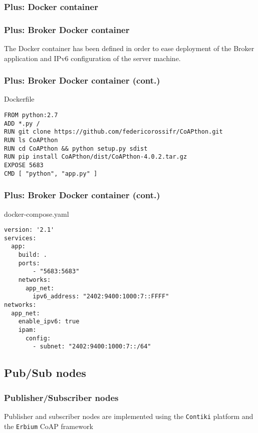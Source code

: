 \documentclass{beamer}
\begin{document}
\subsubsection{Plus: Docker container}
\begin{frame}
\frametitle{Plus: Broker Docker container}
The Docker container has been defined in order to ease deployment of the Broker application and IPv6 configuration of the server machine.
\end{frame}

\begin{frame}[fragile]
\frametitle{Plus: Broker Docker container (cont.)}
\begin{exampleblock}{Dockerfile}
	\begin{Verbatim}[fontsize=\footnotesize]
FROM python:2.7
ADD *.py /
RUN git clone https://github.com/federicorossifr/CoAPthon.git
RUN ls CoAPthon
RUN cd CoAPthon && python setup.py sdist
RUN pip install CoAPthon/dist/CoAPthon-4.0.2.tar.gz
EXPOSE 5683
CMD [ "python", "app.py" ]
	\end{Verbatim}
\end{exampleblock}
\end{frame}

\begin{frame}[fragile]
\frametitle{Plus: Broker Docker container (cont.)}
\begin{exampleblock}{docker-compose.yaml}
	\begin{Verbatim}[fontsize=\footnotesize]
version: '2.1'
services:
  app:
    build: .
    ports:
        - "5683:5683"
    networks:
      app_net:
        ipv6_address: "2402:9400:1000:7::FFFF"
networks:
  app_net:
    enable_ipv6: true
    ipam:
      config:
        - subnet: "2402:9400:1000:7::/64"
	\end{Verbatim}
\end{exampleblock}
\end{frame}

\subsection{Pub/Sub nodes}
\frametitle{Publisher/Subscriber nodes}
\begin{frame}
	Publisher and subscriber nodes are implemented using the \texttt{Contiki} platform and the \texttt{Erbium} CoAP framework
\end{frame}

\end{document}

